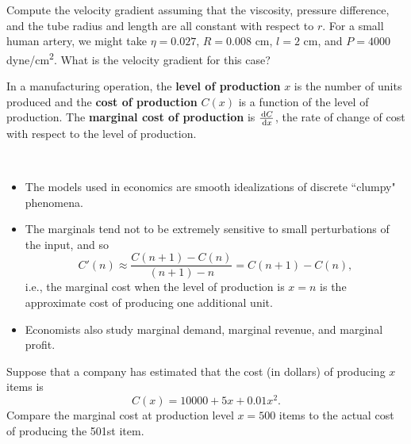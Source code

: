 \begin{example}
Compute the velocity gradient assuming that the viscosity, pressure difference, and the tube radius and length are all constant with respect to $r$.
For a small human artery, we might take $\eta=0.027$, $R=0.008$ \si{cm}, $l=2$ \si{cm}, and $P=4000$ \si{dyne/cm^2}.
What is the velocity gradient for this case?
\end{example}

\newpage

\begin{definition}
In a manufacturing operation, the \textbf{level of production} $x$ is the number of units produced and the \textbf{cost of production} $C(x)$ is a function of the level of production.
The \textbf{marginal cost of production} is $\frac{\mkern 2mu \mathrm{d} C}{\mkern 2mu \mathrm{d} x}$, the rate of change of cost with respect to the level of production.
\end{definition}
\begin{remark}\,
\begin{itemize}
\item The models used in economics are smooth idealizations of discrete ``clumpy" phenomena.
\item The marginals tend not to be extremely sensitive to small perturbations of the input, and so
\begin{equation*}
C'(n)\approx\frac{C(n+1)-C(n)}{(n+1)-n} = C(n+1)-C(n),
\end{equation*}
i.e., the marginal cost when the level of production is $x=n$ is the approximate cost of producing one additional unit.
\item Economists also study marginal demand, marginal revenue, and marginal profit.
\end{itemize}
\end{remark}
\begin{example}
Suppose that a company has estimated that the cost (in dollars) of producing $x$ items is
\begin{equation*}
C(x) = 10000 + 5x + 0.01x^2.
\end{equation*}
Compare the marginal cost at production level $x=500$ items to the actual cost of producing the 501st item.
\end{example}

\newpage

